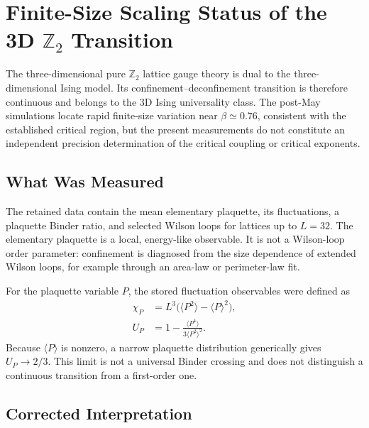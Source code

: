 %

\section{Finite-Size Scaling Status of the 3D \texorpdfstring{$\mathbb{Z}_2$}{Z2} Transition}
\label{sec:t20d-fss}

The three-dimensional pure $\mathbb{Z}_2$ lattice gauge theory is dual to the
three-dimensional Ising model. Its confinement--deconfinement transition is
therefore continuous and belongs to the 3D Ising universality class. The
post-May simulations locate rapid finite-size variation near
$\beta\simeq0.76$, consistent with the established critical region, but the
present measurements do not constitute an independent precision determination
of the critical coupling or critical exponents.

\subsection{What Was Measured}

The retained data contain the mean elementary plaquette, its fluctuations, a
plaquette Binder ratio, and selected Wilson loops for lattices up to $L=32$.
The elementary plaquette is a local, energy-like observable. It is not a
Wilson-loop order parameter: confinement is diagnosed from the size dependence
of extended Wilson loops, for example through an area-law or perimeter-law fit.

For the plaquette variable $P$, the stored fluctuation observables were defined
as
\begin{align}
 \chi_P &= L^3\bigl(\langle P^2\rangle-\langle P\rangle^2\bigr),\\
 U_P &= 1-\frac{\langle P^4\rangle}{3\langle P^2\rangle^2}.
\end{align}
Because $\langle P\rangle$ is nonzero, a narrow plaquette distribution
generically gives $U_P\to2/3$. This limit is not a universal Binder crossing
and does not distinguish a continuous transition from a first-order one.

\subsection{Corrected Interpretation}


